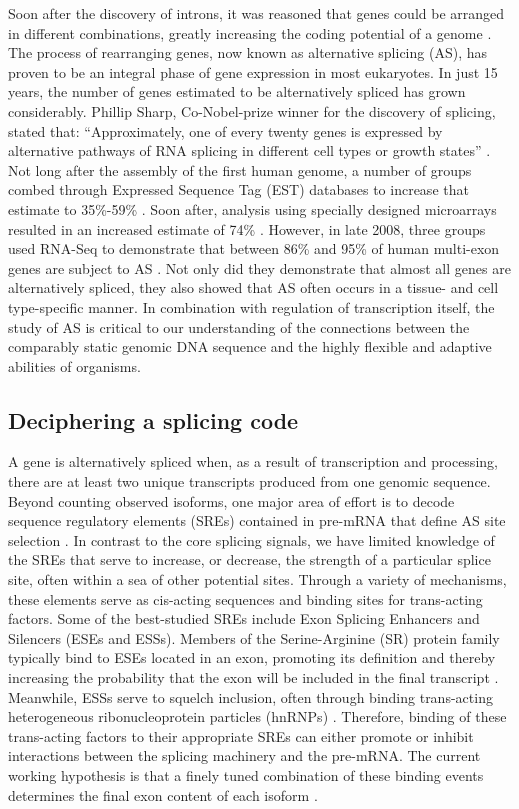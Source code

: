     Soon after the discovery of introns, it was reasoned that genes could be arranged in different combinations, greatly increasing the coding potential of a genome \citep{Gilbert1978a}. The process of rearranging genes, now known as alternative splicing (AS), has proven to be an integral phase of gene expression in most eukaryotes. In just 15 years, the number of genes estimated to be alternatively spliced has grown considerably. Phillip Sharp, Co-Nobel-prize winner for the discovery of splicing, stated that: “Approximately, one of every twenty genes is expressed by alternative pathways of RNA splicing in different cell types or growth states” \cite{Sharp2014}. Not long after the assembly of the first human genome, a number of groups combed through Expressed Sequence Tag (EST) databases to increase that estimate to 35\%-59\% \citep{Modrek2002}. Soon after, analysis using specially designed microarrays resulted in an increased estimate of 74\% \citep{Johnson2003}. However, in late 2008, three groups used RNA-Seq to demonstrate that between 86\% and 95\% of human multi-exon genes are subject to AS \citep{Pan2008, Wang2008, Sultan2008}. Not only did they demonstrate that almost all genes are alternatively spliced, they also showed that AS often occurs in a tissue- and cell type-specific manner. In combination with regulation of transcription itself, the study of AS is critical to our understanding of the connections between the comparably static genomic DNA sequence and the highly flexible and adaptive abilities of organisms.

  \subsection{Deciphering a splicing code}\label{sec: Splicing Code}

    A gene is alternatively spliced when, as a result of transcription and processing, there are at least two unique transcripts produced from one genomic sequence. Beyond counting observed isoforms, one major area of effort is to decode sequence regulatory elements (SREs) contained in pre-mRNA that define AS site selection \citep{Wang2008}. In contrast to the core splicing signals, we have limited knowledge of the SREs that serve to increase, or decrease, the strength of a particular splice site, often within a sea of other potential sites. Through a variety of mechanisms, these elements serve as cis-acting sequences and binding sites for trans-acting factors. Some of the best-studied SREs include Exon Splicing Enhancers and Silencers (ESEs and ESSs). Members of the Serine-Arginine (SR) protein family typically bind to ESEs located in an exon, promoting its definition and thereby increasing the probability that the exon will be included in the final transcript \citep{Graveley2000,Long2009}. Meanwhile, ESSs serve to squelch inclusion, often through binding trans-acting heterogeneous ribonucleoprotein particles (hnRNPs) \citep{Martinez-Contreras2007}. Therefore, binding of these trans-acting factors to their appropriate SREs can either promote or inhibit interactions between the splicing machinery and the pre-mRNA. The current working hypothesis is that a finely tuned combination of these binding events determines the final exon content of each isoform \citep{House2008}.

